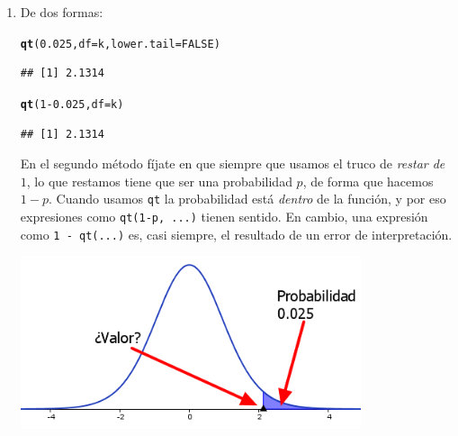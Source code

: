\documentclass[10pt,a4paper]{article}\usepackage[]{graphicx}\usepackage[]{color}
\makeatletter
\newcommand{\hlnum}[1]{\textcolor[rgb]{0.686,0.059,0.569}{#1}}%
\newcommand{\hlopt}[1]{\textcolor[rgb]{0,0,0}{#1}}%
\newcommand{\hlstd}[1]{\textcolor[rgb]{0.345,0.345,0.345}{#1}}%
\newcommand{\hlkwc}[1]{\textcolor[rgb]{0.333,0.667,0.333}{#1}}%
\newcommand{\hlkwd}[1]{\textcolor[rgb]{0.737,0.353,0.396}{\textbf{#1}}}%
\newenvironment{kframe}{%
 \def\at@end@of@kframe{}%
 \ifinner\ifhmode%
  \def\at@end@of@kframe{\end{minipage}}%
  \begin{minipage}{\columnwidth}%
 \fi\fi%
 \def\FrameCommand##1{\hskip\@totalleftmargin \hskip-\fboxsep
 \colorbox{shadecolor}{##1}\hskip-\fboxsep
     \hskip-\linewidth \hskip-\@totalleftmargin \hskip\columnwidth}%
 \MakeFramed {\advance\hsize-\width
   \@totalleftmargin\z@ \linewidth\hsize
   \@setminipage}}%
 {\par\unskip\endMakeFramed%
 \at@end@of@kframe}
\newenvironment{knitrout}{}{} %
\makeatother
\begin{document}
\begin{enumerate}
  \item
  De dos formas:
\begin{knitrout}
\color{fgcolor}\begin{kframe}
\begin{alltt}
\hlkwd{qt}\hlstd{(}\hlnum{0.025}\hlstd{,} \hlkwc{df}\hlstd{=k,} \hlkwc{lower.tail}\hlstd{=}\hlnum{FALSE}\hlstd{)}
\end{alltt}
\begin{verbatim}
## [1] 2.1314
\end{verbatim}
\begin{alltt}
\hlkwd{qt}\hlstd{(}\hlnum{1} \hlopt{-} \hlnum{0.025}\hlstd{,} \hlkwc{df}\hlstd{=k)}
\end{alltt}
\begin{verbatim}
## [1] 2.1314
\end{verbatim}
\end{kframe}
\end{knitrout}
  En el segundo método fíjate en que siempre que usamos el truco de {\em restar de $1$}, lo que restamos tiene que ser una probabilidad $p$, de forma que hacemos $1 - p$. Cuando usamos {\tt qt} la probabilidad está {\em dentro} de la función, y por eso expresiones como {\tt qt(1-p, ...)} tienen sentido. En cambio, una expresión como {\tt 1 - qt(...)} es, casi siempre, el resultado de un error de interpretación.
  \begin{center}
        \includegraphics[width=10cm]{../fig/Tut06-24.png}
  \end{center}



\end{enumerate}
\end{document}
